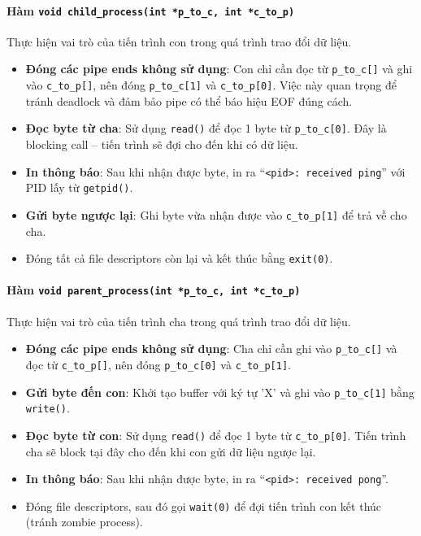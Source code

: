 \paragraph{Hàm \texttt{void child\_process(int *p\_to\_c, int *c\_to\_p)}}
Thực hiện vai trò của tiến trình con trong quá trình trao đổi dữ liệu.
\begin{itemize}
    \item \textbf{Đóng các pipe ends không sử dụng}: Con chỉ cần đọc từ \texttt{p\_to\_c[]} và ghi vào \texttt{c\_to\_p[]}, nên đóng \texttt{p\_to\_c[1]} và \texttt{c\_to\_p[0]}. Việc này quan trọng để tránh deadlock và đảm bảo pipe có thể báo hiệu EOF đúng cách.
    \item \textbf{Đọc byte từ cha}: Sử dụng \texttt{read()} để đọc 1 byte từ \texttt{p\_to\_c[0]}. Đây là blocking call -- tiến trình sẽ đợi cho đến khi có dữ liệu.
    \item \textbf{In thông báo}: Sau khi nhận được byte, in ra ``\texttt{<pid>: received ping}'' với PID lấy từ \texttt{getpid()}.
    \item \textbf{Gửi byte ngược lại}: Ghi byte vừa nhận được vào \texttt{c\_to\_p[1]} để trả về cho cha.
    \item Đóng tất cả file descriptors còn lại và kết thúc bằng \texttt{exit(0)}.
\end{itemize}

\paragraph{Hàm \texttt{void parent\_process(int *p\_to\_c, int *c\_to\_p)}}
Thực hiện vai trò của tiến trình cha trong quá trình trao đổi dữ liệu.
\begin{itemize}
    \item \textbf{Đóng các pipe ends không sử dụng}: Cha chỉ cần ghi vào \texttt{p\_to\_c[]} và đọc từ \texttt{c\_to\_p[]}, nên đóng \texttt{p\_to\_c[0]} và \texttt{c\_to\_p[1]}.
    \item \textbf{Gửi byte đến con}: Khởi tạo buffer với ký tự 'X' và ghi vào \texttt{p\_to\_c[1]} bằng \texttt{write()}.
    \item \textbf{Đọc byte từ con}: Sử dụng \texttt{read()} để đọc 1 byte từ \texttt{c\_to\_p[0]}. Tiến trình cha sẽ block tại đây cho đến khi con gửi dữ liệu ngược lại.
    \item \textbf{In thông báo}: Sau khi nhận được byte, in ra ``\texttt{<pid>: received pong}''.
    \item Đóng file descriptors, sau đó gọi \texttt{wait(0)} để đợi tiến trình con kết thúc (tránh zombie process).
\end{itemize}